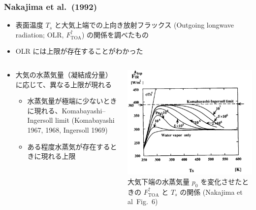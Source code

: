\documentclass[aspectratio=149]{beamer}
\newcommand{\hmTOA}{\mathrm{TOA}}
\begin{document}
\begin{frame}
	\frametitle{Nakajima et al.\ (1992)}
	\begin{itemize}
		\item 表面温度 \(T_s\) と大気上端での上向き放射フラックス
			(Outgoing longwave radiation; OLR, \(F^\uparrow_\hmTOA\))
			の関係を調べたもの
		\item OLR には上限が存在することがわかった
	\end{itemize}
	\begin{columns}[onlytextwidth,T]
		\begin{column}{.6\textwidth}
			\begin{itemize}
				\item 大気の水蒸気量（凝結成分量）に応じて、異なる上限が現れる
					\begin{itemize}
						\item 水蒸気量が極端に少ないときに現れる、Komabayashi--Ingersoll limit
							(Komabayashi 1967, 1968, Ingersoll 1969)
						\item ある程度水蒸気が存在するときに現れる上限
					\end{itemize}
			\end{itemize}
		\end{column}
		\begin{column}{.35\textwidth}
			\centering\scriptsize
			\includegraphics[width=\textwidth]{nakajima6.png}\\
			大気下端の水蒸気量 \(p_0\) を変化させたときの \(F^\uparrow_\hmTOA\) と
			\(T_s\) の関係 (Nakajima et al\ Fig.~6)
		\end{column}
	\end{columns}
\end{frame}
\end{document}
